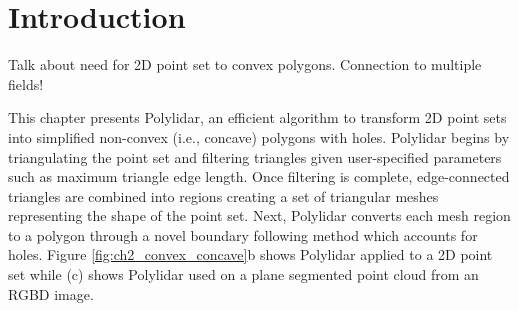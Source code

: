 \section{Introduction}

Talk about need for 2D point set to convex polygons. Connection to multiple fields!

This chapter presents Polylidar, an efficient algorithm to transform 2D point sets into simplified non-convex (i.e., concave) polygons with holes. Polylidar begins by triangulating the point set and filtering triangles given user-specified parameters such as maximum triangle edge length. Once filtering is complete, edge-connected triangles are combined into regions creating a set of triangular meshes representing the shape of the point set. Next, Polylidar converts each mesh region to a polygon through a novel boundary following method which accounts for holes. Figure \ref{fig:ch2_convex_concave}b shows Polylidar applied to a 2D point set while (c) shows Polylidar used on a plane segmented point cloud from an RGBD image.


